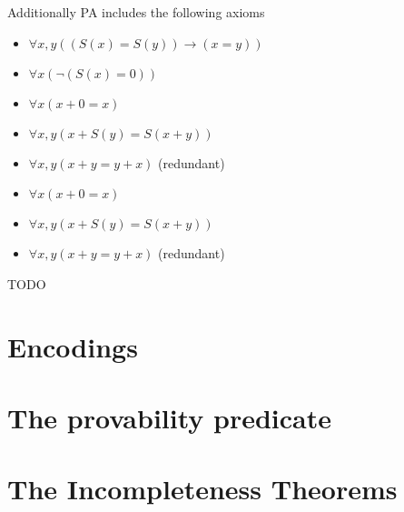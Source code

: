 \documentclass[12pt]{article}
\begin{document}
	Additionally PA includes the following axioms
	
	\begin{tcolorbox}[colback=green!5!white,colframe=green!75!black,title={\bf Successor axioms}]
		\begin{itemize}
			\item $\forall x, y ((S(x)=S(y)) \to (x=y))$
			\item $\forall x (\lnot (S(x)=0))$ 
		\end{itemize}
	\end{tcolorbox}
	
	\begin{tcolorbox}[colback=green!5!white,colframe=green!75!black,title={\bf Addition axioms}]
		\begin{itemize}
			\item $\forall x (x+0 = x)$
			\item $\forall x, y (x+S(y) = S(x+y))$
			\item $\forall x, y (x+y=y+x)$ (redundant)
		\end{itemize}
	\end{tcolorbox}
	
	\begin{tcolorbox}[colback=green!5!white,colframe=green!75!black,title={\bf Multiplication axioms}]
		\begin{itemize}
			\item $\forall x (x+0 = x)$
			\item $\forall x, y (x+S(y) = S(x+y))$
			\item $\forall x, y (x+y=y+x)$ (redundant)
		\end{itemize}
	\end{tcolorbox}
	
	\begin{tcolorbox}[colback=green!5!white,colframe=green!75!black,title={\bf Inequality axioms}]
		TODO
	\end{tcolorbox}
	
		
	\section{Encodings}
	\section{The provability predicate}
	\section{The Incompleteness Theorems}
	
\end{document}
